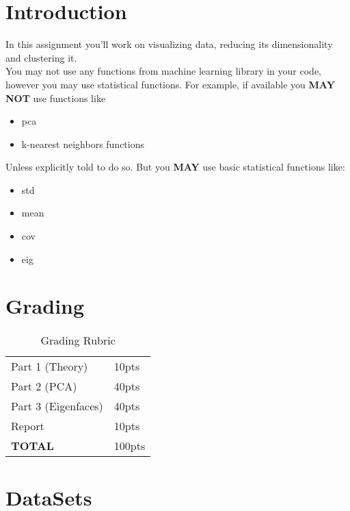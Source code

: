 \documentclass[12pt]{article}
\begin{document}
\maketitle


\section*{Introduction}
In this assignment you'll work on visualizing data, reducing its dimensionality and clustering it.\\

\noindent
You may not use any functions from machine learning library in your code, however you may use statistical functions.  For example, if available you \textbf{MAY NOT} use functions like

\begin{itemize}
\item pca
\item k-nearest neighbors functions
\end{itemize}

\noindent
Unless explicitly told to do so.  But you \textbf{MAY} use basic statistical functions like:
\begin{itemize}
\item std
\item mean
\item cov
\item eig
\end{itemize}



\section*{Grading}
\begin{table}[h]
\begin{centering}
\begin{tabular}{|l|l|}
\hline
Part 1 (Theory) & 10pts \\
Part 2 (PCA) & 40pts\\
Part 3 (Eigenfaces) & 40pts \\
Report & 10pts\\
\hline
\textbf{TOTAL} & 100pts\\
\hline
\end{tabular}
\caption{Grading Rubric}
\end{centering}
\end{table}

\newpage
\section*{DataSets}
\end{document}

